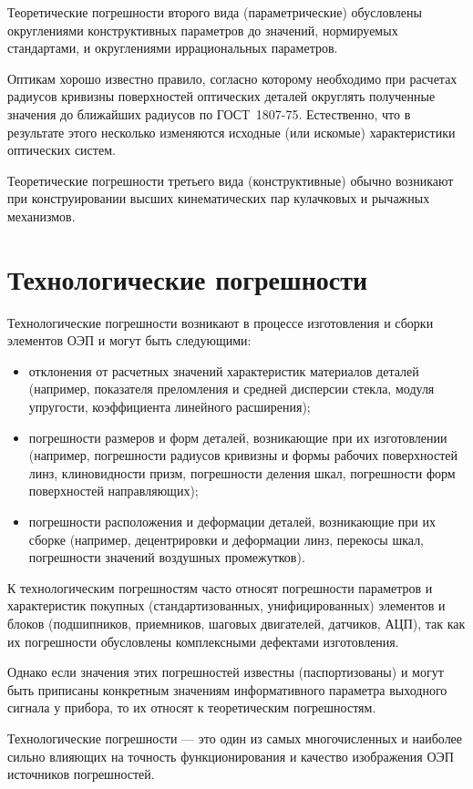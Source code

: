Теоретические погрешности второго вида (параметрические) обусловлены округлениями конструктивных параметров до значений, нормируемых стандартами, и округлениями иррациональных параметров.

Оптикам хорошо известно правило, согласно которому необходимо при расчетах радиусов кривизны поверхностей оптических деталей округлять полученные значения до ближайших радиусов по ГОСТ~1807-75. Естественно, что в результате этого несколько изменяются исходные (или искомые) характеристики оптических систем.

Теоретические погрешности третьего вида (конструктивные) обычно возникают при конструировании высших кинематических пар кулачковых и рычажных механизмов.

\section{Технологические погрешности}

Технологические погрешности возникают в процессе изготовления и сборки элементов ОЭП и могут быть следующими:
\begin{itemize}
\item отклонения от расчетных значений характеристик материалов деталей (например, показателя преломления и средней дисперсии стекла, модуля упругости, коэффициента линейного расширения);
\item погрешности размеров и форм деталей, возникающие при их изготовлении (например, погрешности радиусов кривизны и формы рабочих поверхностей линз, клиновидности призм, погрешности деления шкал, погрешности форм поверхностей направляющих);
\item погрешности расположения и деформации деталей, возникающие при их сборке (например, децентрировки и деформации линз, перекосы шкал, погрешности значений воздушных промежутков).
\end{itemize}

К технологическим погрешностям часто относят погрешности параметров и характеристик покупных (стандартизованных, унифицированных) элементов и блоков (подшипников, приемников, шаговых двигателей, датчиков, АЦП), так как их погрешности обусловлены комплексными дефектами изготовления.

Однако если значения этих погрешностей известны (паспортизованы) и могут быть приписаны конкретным значениям информативного параметра выходного сигнала у прибора, то их относят к теоретическим погрешностям.

Технологические погрешности --- это один из самых многочисленных и наиболее сильно влияющих на точность функционирования и качество изображения ОЭП источников погрешностей.

